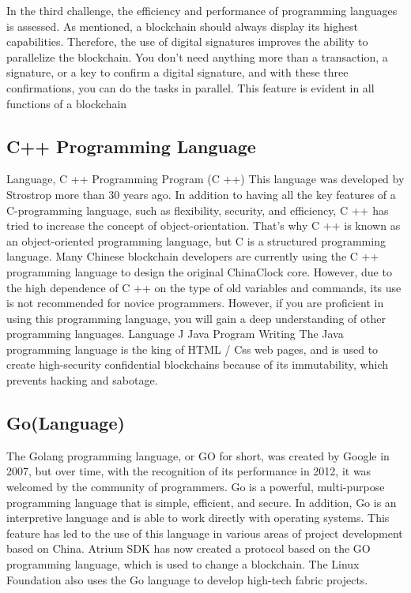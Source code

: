 \begin{flushleft}
In the third challenge, the efficiency and performance of programming languages is assessed.
As mentioned, a blockchain should always display its highest capabilities. Therefore, the use of digital signatures improves the ability to parallelize the blockchain. You don't need anything more than a transaction, a signature, or a key to confirm a digital signature, and with these three confirmations, you can do the tasks in parallel. This feature is evident in all functions of a blockchain

\subsection{C++ Programming Language}
Language, C ++ Programming Program (C ++)
This language was developed by Strostrop more than 30 years ago. In addition to having all the key features of a C-programming language, such as flexibility, security, and efficiency, C ++ has tried to increase the concept of object-orientation. That's why C ++ is known as an object-oriented programming language, but C is a structured programming language.
Many Chinese blockchain developers are currently using the C ++ programming language to design the original ChinaClock core. However, due to the high dependence of C ++ on the type of old variables and commands, its use is not recommended for novice programmers. However, if you are proficient in using this programming language, you will gain a deep understanding of other programming languages.
Language J Java Program Writing
The Java programming language is the king of HTML / Css web pages, and is used to create high-security confidential blockchains because of its immutability, which prevents hacking and sabotage.

\subsection{Go(Language)
}
The Golang programming language, or GO for short, was created by Google in 2007, but over time, with the recognition of its performance in 2012, it was welcomed by the community of programmers. Go is a powerful, multi-purpose programming language that is simple, efficient, and secure. In addition, Go is an interpretive language and is able to work directly with operating systems. This feature has led to the use of this language in various areas of project development based on China.
Atrium SDK has now created a protocol based on the GO programming language, which is used to change a blockchain. The Linux Foundation also uses the Go language to develop high-tech fabric projects.


\end{flushleft}
